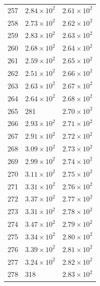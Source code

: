 \begin{table}[H]
\begin{tabular}{lll}
257 & $\displaystyle 2.84 \times 10^{2}$ & $\displaystyle 2.61 \times 10^{2}$ \\
258 & $\displaystyle 2.73 \times 10^{2}$ & $\displaystyle 2.62 \times 10^{2}$ \\
259 & $\displaystyle 2.83 \times 10^{2}$ & $\displaystyle 2.63 \times 10^{2}$ \\
260 & $\displaystyle 2.68 \times 10^{2}$ & $\displaystyle 2.64 \times 10^{2}$ \\
261 & $\displaystyle 2.59 \times 10^{2}$ & $\displaystyle 2.65 \times 10^{2}$ \\
262 & $\displaystyle 2.51 \times 10^{2}$ & $\displaystyle 2.66 \times 10^{2}$ \\
263 & $\displaystyle 2.63 \times 10^{2}$ & $\displaystyle 2.67 \times 10^{2}$ \\
264 & $\displaystyle 2.64 \times 10^{2}$ & $\displaystyle 2.68 \times 10^{2}$ \\
265 & 281 & $\displaystyle 2.70 \times 10^{2}$ \\
266 & $\displaystyle 2.93 \times 10^{2}$ & $\displaystyle 2.71 \times 10^{2}$ \\
267 & $\displaystyle 2.91 \times 10^{2}$ & $\displaystyle 2.72 \times 10^{2}$ \\
268 & $\displaystyle 3.09 \times 10^{2}$ & $\displaystyle 2.73 \times 10^{2}$ \\
269 & $\displaystyle 2.99 \times 10^{2}$ & $\displaystyle 2.74 \times 10^{2}$ \\
270 & $\displaystyle 3.11 \times 10^{2}$ & $\displaystyle 2.75 \times 10^{2}$ \\
271 & $\displaystyle 3.31 \times 10^{2}$ & $\displaystyle 2.76 \times 10^{2}$ \\
272 & $\displaystyle 3.37 \times 10^{2}$ & $\displaystyle 2.77 \times 10^{2}$ \\
273 & $\displaystyle 3.31 \times 10^{2}$ & $\displaystyle 2.78 \times 10^{2}$ \\
274 & $\displaystyle 3.47 \times 10^{2}$ & $\displaystyle 2.79 \times 10^{2}$ \\
275 & $\displaystyle 3.34 \times 10^{2}$ & $\displaystyle 2.80 \times 10^{2}$ \\
276 & $\displaystyle 3.39 \times 10^{2}$ & $\displaystyle 2.81 \times 10^{2}$ \\
277 & $\displaystyle 3.24 \times 10^{2}$ & $\displaystyle 2.82 \times 10^{2}$ \\
278 & 318 & $\displaystyle 2.83 \times 10^{2}$ \\

\end{tabular}
\end{table}
